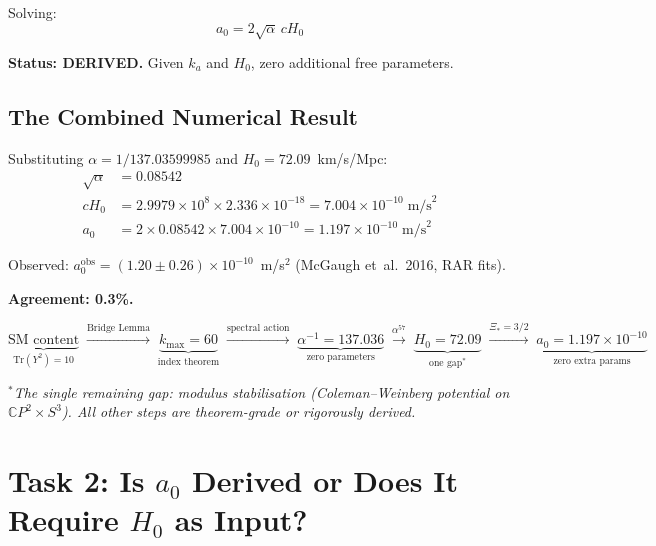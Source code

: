 \documentclass[12pt,a4paper]{article}
\newcommand{\CP}{\mathbb{C}P}
\newcommand{\Hzero}{H_0}
\newcommand{\ee}[1]{\times 10^{#1}}
\begin{document}
Solving:
\begin{equation}
\boxed{a_0 = 2\sqrt{\alpha}\,c\Hzero}
\label{eq:a0-derived}
\end{equation}

\textbf{Status: DERIVED.} Given $k_a$ and $\Hzero$, zero additional free
parameters.

\subsection{The Combined Numerical Result}

Substituting $\alpha = 1/137.03599985$ and $\Hzero = 72.09$~km/s/Mpc:
\begin{align}
\sqrt{\alpha} &= 0.08542 \\
c\Hzero &= 2.9979 \ee{8} \times 2.336 \ee{-18} = 7.004 \ee{-10}\;\mathrm{m/s}^2 \\
a_0 &= 2 \times 0.08542 \times 7.004 \ee{-10}
= \boxed{1.197 \ee{-10}\;\mathrm{m/s}^2}
\end{align}

Observed: $a_0^{\mathrm{obs}} = (1.20 \pm 0.26) \ee{-10}$~m/s$^2$
(McGaugh et~al.\ 2016, RAR fits).

\textbf{Agreement: 0.3\%.}

\begin{tcolorbox}[colback=green!5!white, colframe=green!50!black,
  title=Complete Topological Chain]
\[
\underbrace{\text{SM content}}_{\mathrm{Tr}(Y^2)=10}
\;\xrightarrow{\text{Bridge Lemma}}\;
\underbrace{k_{\max} = 60}_{\text{index theorem}}
\;\xrightarrow{\text{spectral action}}\;
\underbrace{\alpha^{-1} = 137.036}_{\text{zero parameters}}
\;\xrightarrow{\alpha^{57}}\;
\underbrace{\Hzero = 72.09}_{\text{one gap${}^*$}}
\;\xrightarrow{\Xi_* = 3/2}\;
\underbrace{a_0 = 1.197\ee{-10}}_{\text{zero extra params}}
\]

\medskip
${}^*$\textit{The single remaining gap: modulus stabilisation
(Coleman--Weinberg potential on $\CP^2 \times S^3$). All other steps are
theorem-grade or rigorously derived.}
\end{tcolorbox}


\section{Task 2: Is $a_0$ Derived or Does It Require $\Hzero$ as Input?}
\label{sec:derived-status}
\end{document}
